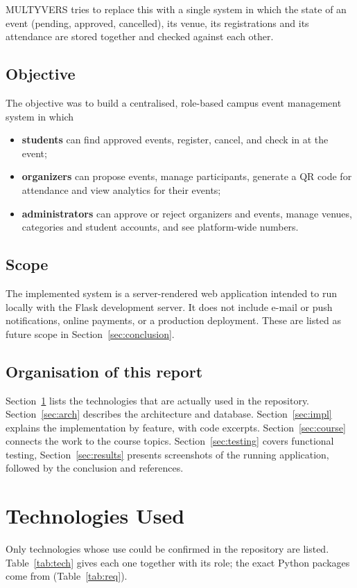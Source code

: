 \documentclass[11pt,a4paper]{article}
\DeclareRobustCommand{\code}[1]{\texttt{\StrSubstitute{\detokenize{#1}}{\string_}{\_\allowbreak}}}
\begin{document}
MULTYVERS tries to replace this with a single system in which the state of an event
(pending, approved, cancelled), its venue, its registrations and its attendance are stored
together and checked against each other.

\subsection{Objective}
The objective was to build a centralised, role-based campus event management system in which

\begin{itemize}
  \item \textbf{students} can find approved events, register, cancel, and check in at the event;
  \item \textbf{organizers} can propose events, manage participants, generate a QR code for
        attendance and view analytics for their events;
  \item \textbf{administrators} can approve or reject organizers and events, manage venues, categories
        and student accounts, and see platform-wide numbers.
\end{itemize}

\subsection{Scope}
The implemented system is a server-rendered web application intended to run locally with the Flask
development server. It does not include e-mail or push notifications, online payments, or a production
deployment. These are listed as future scope in Section~\ref{sec:conclusion}.

\subsection{Organisation of this report}
Section~\ref{sec:tech} lists the technologies that are actually used in the repository.
Section~\ref{sec:arch} describes the architecture and database. Section~\ref{sec:impl}
explains the implementation by feature, with code excerpts. Section~\ref{sec:course} connects
the work to the course topics. Section~\ref{sec:testing} covers functional testing,
Section~\ref{sec:results} presents screenshots of the running application, followed by the conclusion and references.

\section{Technologies Used}
\label{sec:tech}
Only technologies whose use could be confirmed in the repository are listed.
Table~\ref{tab:tech} gives each one together with its role; the exact Python packages come from
\code{requirements.txt} (Table~\ref{tab:req}).
\end{document}
